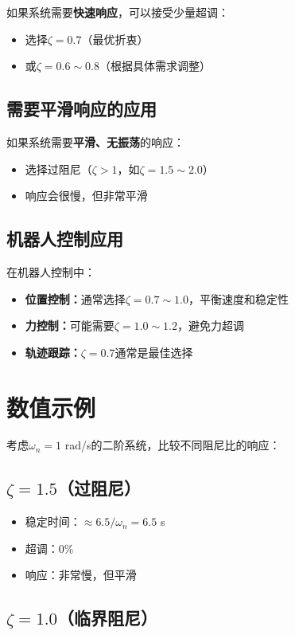 \documentclass[12pt,a4paper]{article}
\begin{document}
如果系统需要\textbf{快速响应}，可以接受少量超调：
\begin{itemize}
\item 选择$\zeta = 0.7$（最优折衷）
\item 或$\zeta = 0.6 \sim 0.8$（根据具体需求调整）
\end{itemize}

\subsection{需要平滑响应的应用}

如果系统需要\textbf{平滑、无振荡}的响应：
\begin{itemize}
\item 选择过阻尼（$\zeta > 1$，如$\zeta = 1.5 \sim 2.0$）
\item 响应会很慢，但非常平滑
\end{itemize}

\subsection{机器人控制应用}

在机器人控制中：
\begin{itemize}
\item \textbf{位置控制：}通常选择$\zeta = 0.7 \sim 1.0$，平衡速度和稳定性
\item \textbf{力控制：}可能需要$\zeta = 1.0 \sim 1.2$，避免力超调
\item \textbf{轨迹跟踪：}$\zeta = 0.7$通常是最佳选择
\end{itemize}

\section{数值示例}

考虑$\omega_n = 1$ rad/s的二阶系统，比较不同阻尼比的响应：

\subsection{$\zeta = 1.5$（过阻尼）}

\begin{itemize}
\item 稳定时间：$\approx 6.5/\omega_n = 6.5$ s
\item 超调：0\%
\item 响应：非常慢，但平滑
\end{itemize}

\subsection{$\zeta = 1.0$（临界阻尼）}
\end{document}
